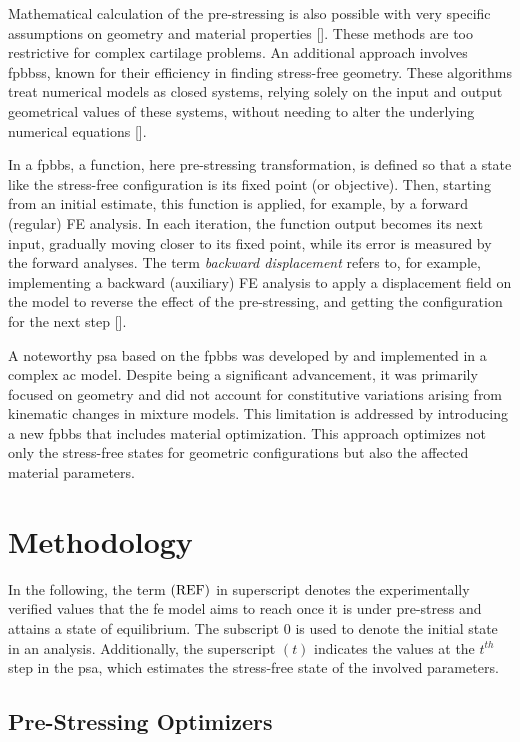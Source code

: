 \documentclass[12pt,a4paper]{report}
\begin{document}
Mathematical calculation of the pre-stressing is also possible with very specific assumptions on geometry and material properties [\cite{alastru2007,rachev2003,taber1996}]. These methods are too restrictive for complex cartilage problems. An additional approach involves \acp{fpbbs}, known for their efficiency in finding stress-free geometry. These algorithms treat numerical models as closed systems, relying solely on the input and output geometrical values of these systems, without needing to alter the underlying numerical equations [\cite{leach2019}].

In a \ac{fpbbs}, a function, here pre-stressing transformation, is defined so that a state like the stress-free configuration is its fixed point (or objective). Then, starting from an initial estimate, this function is applied, for example, by a forward (regular) FE analysis. In each iteration, the function output becomes its next input, gradually moving closer to its fixed point, while its error is measured by the forward analyses. The term \textit{backward displacement} refers to, for example, implementing a backward (auxiliary) FE analysis to apply a displacement field on the model to reverse the effect of the pre-stressing, and getting the configuration for the next step [\cite{leach2019}].

A noteworthy \ac{psa} based on the \ac{fpbbs} was developed by \cite{wang2018} and implemented in a complex \ac{ac} model. Despite being a significant advancement, it was primarily focused on geometry and did not account for constitutive variations arising from kinematic changes in mixture models. This limitation is addressed by introducing a new \ac{fpbbs} that includes material optimization. This approach optimizes not only the stress-free states for geometric configurations but also the affected material parameters.

\section{Methodology}
In the following, the term $\rm{(REF)}$ in superscript denotes the experimentally verified values that the \ac{fe} model aims to reach once it is under pre-stress and attains a state of equilibrium. The subscript $0$ is used to denote the initial state in an analysis. Additionally, the superscript $(t)$ indicates the values at the $t^{th}$ step in the \ac{psa}, which estimates the stress-free state of the involved parameters.

\subsection{Pre-Stressing Optimizers}
\end{document}
